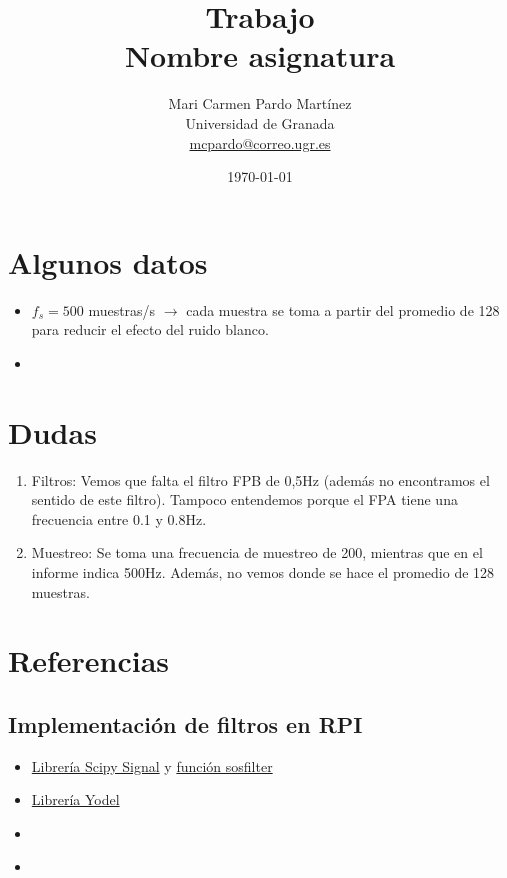 \documentclass[twoside, twocolumn, spanish] {article}
\title{Trabajo \\[0.5cm]	
	\Large{Nombre asignatura} \\
}
\author{%
	Mari Carmen Pardo Martínez \\
	\normalsize{Universidad de Granada}\\
	\normalsize{\href{mailto:mcpardo@correo.ugr.es}{mcpardo@correo.ugr.es}}
	}
\date{\today}
\begin{document}
\thispagestyle{empty}
\maketitle

\tableofcontents

\section{Algunos datos}

\begin{itemize}
\item $f_s=500$ muestras/s $\rightarrow$ cada muestra se toma a partir del promedio de 128 para reducir el efecto del ruido blanco.
\item 
\end{itemize}

\section{Dudas}
\begin{enumerate}
\item Filtros: Vemos que falta el filtro FPB de 0,5Hz (además no encontramos el sentido de este filtro). Tampoco entendemos porque el FPA tiene una frecuencia entre 0.1 y 0.8Hz.
\item Muestreo: Se toma una frecuencia de muestreo de 200, mientras que en el informe indica 500Hz. Además, no vemos donde se hace el promedio de 128 muestras.
\end{enumerate}


\section{Referencias}
\subsection{Implementación de filtros en RPI}
\begin{itemize}
\item \href{https://docs.scipy.org/doc/scipy/reference/signal.html}{Librería Scipy Signal} y \href{https://docs.scipy.org/doc/scipy/reference/generated/scipy.signal.sosfilt.html#scipy.signal.sosfilt}{función sosfilter}
\item \href{https://pypi.org/project/yodel/}{Librería Yodel}
\item \href{}{}
\item \href{}{}
\end{itemize}



\clearpage
\thispagestyle{fancy}
\end{document}
